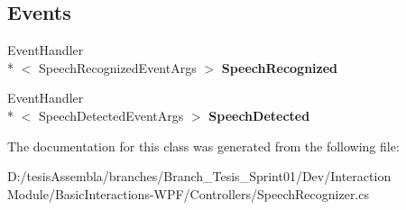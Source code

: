 \subsection*{Events}
\begin{DoxyCompactItemize}
\item 
\hypertarget{class_microsoft_1_1_samples_1_1_kinect_1_1_basic_interactions_1_1_speech_recognizer_a9a3d0e0c27669a5605e0131921179ab0}{Event\-Handler\\*
$<$ Speech\-Recognized\-Event\-Args $>$ {\bfseries Speech\-Recognized}}\label{class_microsoft_1_1_samples_1_1_kinect_1_1_basic_interactions_1_1_speech_recognizer_a9a3d0e0c27669a5605e0131921179ab0}

\item 
\hypertarget{class_microsoft_1_1_samples_1_1_kinect_1_1_basic_interactions_1_1_speech_recognizer_af88f3c627d1c9797cc8cbb4202e56b10}{Event\-Handler\\*
$<$ Speech\-Detected\-Event\-Args $>$ {\bfseries Speech\-Detected}}\label{class_microsoft_1_1_samples_1_1_kinect_1_1_basic_interactions_1_1_speech_recognizer_af88f3c627d1c9797cc8cbb4202e56b10}

\end{DoxyCompactItemize}


The documentation for this class was generated from the following file\-:\begin{DoxyCompactItemize}
\item 
D\-:/tesis\-Assembla/branches/\-Branch\-\_\-\-Tesis\-\_\-\-Sprint01/\-Dev/\-Interaction Module/\-Basic\-Interactions-\/\-W\-P\-F/\-Controllers/Speech\-Recognizer.\-cs\end{DoxyCompactItemize}
